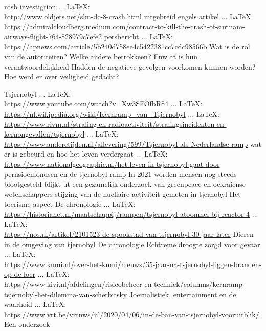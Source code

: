 \begin{thebibliography}{99}
{{{	ntsb investigtion
	 ... \LaTeX:\\ \url{http://www.oldjets.net/slm-dc-8-crash.html}
	uitgebreid engels artikel
	 ... \LaTeX:\\ \url{https://admiralcloudberg.medium.com/contract-to-kill-the-crash-of-surinam-airways-flight-764-828979c7efe2}
	persbericht
	 ... \LaTeX:\\ \url{https://apnews.com/article/5b240d758ee4c5422381cc7cdc98566b}
	Wat is de rol van de autoriteiten?
	Welke andere betrokkeen? Enw at is hun verantwoordelijkheid
	Hadden de negatieve gevolgen voorkomen kunnen worden?
	Hoe werd er over veiligheid gedacht?
	
	
	
	
	Tsjernobyl
	 ... \LaTeX:\\ \url{https://www.youtube.com/watch?v=Xw3SFOfbR84}
	 ... \LaTeX:\\ \url{https://nl.wikipedia.org/wiki/Kernramp_van_Tsjernobyl}
	 ... \LaTeX:\\ \url{https://www.rivm.nl/straling-en-radioactiviteit/stralingsincidenten-en-kernongevallen/tsjernobyl}
	 ... \LaTeX:\\ \url{https://www.anderetijden.nl/aflevering/599/Tsjernobyl-als-Nederlandse-ramp}
	wat er is gebeurd en hoe het leven verdergaat
	 ... \LaTeX:\\ \url{https://www.nationalgeographic.nl/het-leven-in-tsjernobyl-gaat-door}
	pernsioenfondsen en de tjernobyl ramp
	In 2021 worden mensen nog steeds blootgesteld blijkt ut een gezamelijk onderzoek van greenpeace en oekraiense wetenschappers
	stijging van de nucliaire activiteit gemeten in tjernobyl
	Het toerisme  aspect
	De chronologie
	 ... \LaTeX:\\ \url{https://historianet.nl/maatschappij/rampen/tsjernobyl-atoomhel-bij-reactor-4}
	 ... \LaTeX:\\ \url{https://nos.nl/artikel/2101523-de-spookstad-van-tsjernobyl-30-jaar-later}
	Dieren in de omgeving van tjernobyl
	De chronologie
	Echtreme droogte zorgd voor gevaar
	 ... \LaTeX:\\ \url{https://www.knmi.nl/over-het-knmi/nieuws/35-jaar-na-tsjernobyl-liggen-branden-op-de-loer}
	 ... \LaTeX:\\ \url{https://www.kivi.nl/afdelingen/risicobeheer-en-techniek/columns/kernramp-tsjernobyl-het-dilemma-van-scherbitsky}
	Joernalistiek, entertainment en de waarheid
	 ... \LaTeX:\\ \url{https://www.vrt.be/vrtnws/nl/2020/04/06/in-de-ban-van-tsjernobyl-vooruitblik/}
	Een onderzoek
	
}}}
\end{thebibliography}
